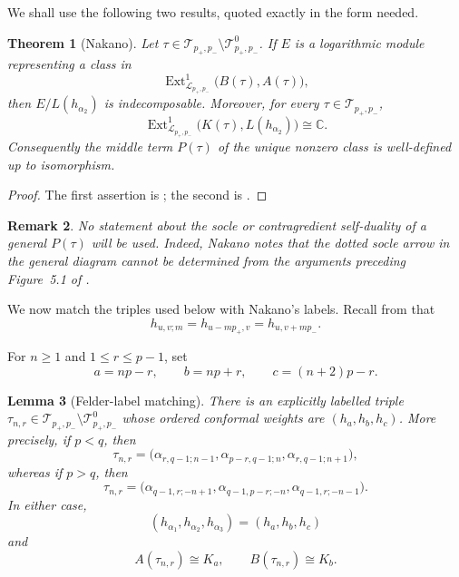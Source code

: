 \documentclass[12pt,leqno]{amsart}
\numberwithin{equation}{section}
\newtheorem{thm}{Theorem}[section]
\newtheorem{lem}[thm]{Lemma}
\newtheorem{rmk}[thm]{Remark}
\newcommand{\Ext}{\operatorname{Ext}}
\def\C{\mathbb{C}}
\begin{document}
We shall use the following two results, quoted exactly in the form needed.

\begin{thm}[Nakano]\label{thm:Nakano-input}
Let $\tau\in\mathcal T_{p_+,p_-}\setminus\mathcal T^0_{p_+,p_-}$.  If $E$ is a
logarithmic module representing a class in
\[
 \Ext^1_{\mathscr L_{p_+,p_-}}\bigl(B(\tau),A(\tau)\bigr),
\]
then $E/L(h_{\alpha_2})$ is indecomposable.  Moreover, for every
$\tau\in\mathcal T_{p_+,p_-}$,
\[
 \Ext^1_{\mathscr L_{p_+,p_-}}
 \bigl(K(\tau),L(h_{\alpha_2})\bigr)\cong\C.
\]
Consequently the middle term $P(\tau)$ of the unique nonzero class is
well-defined up to isomorphism.
\end{thm}

\begin{proof}
The first assertion is \cite[Theorem~5.11]{Nakano}; the second is
\cite[Proposition~5.12 and Definition~5.13]{Nakano}.
\end{proof}

\begin{rmk}\label{rmk:no-socle}
No statement about the socle or contragredient self-duality of a general
$P(\tau)$ will be used.  Indeed, Nakano notes that the dotted socle arrow in
the general diagram cannot be determined from the arguments preceding
Figure~5.1 of \cite{Nakano}.
\end{rmk}

We now match the triples used below with Nakano's labels.  Recall from
\cite[(2.3)--(2.4)]{Nakano} that
\begin{equation}\label{eq:Nakano-weight-shift}
 h_{u,v;m}=h_{u-mp_+,v}=h_{u,v+mp_-}.
\end{equation}

For $n\geq1$ and $1\leq r\leq p-1$, set
\begin{equation}\label{eq:abc}
 a=np-r,\qquad b=np+r,\qquad c=(n+2)p-r.
\end{equation}

\begin{lem}[Felder-label matching]\label{lem:Felder-labels}
There is an explicitly labelled triple
\(\tau_{n,r}\in\mathcal T_{p_+,p_-}\setminus\mathcal T^0_{p_+,p_-}\) whose ordered
conformal weights are \((h_a,h_b,h_c)\).  More precisely, if $p<q$, then
\begin{equation}\label{eq:tau-p-less-q}
 \tau_{n,r}=
 \bigl(\alpha_{r,q-1;n-1},
       \alpha_{p-r,q-1;n},
       \alpha_{r,q-1;n+1}\bigr),
\end{equation}
whereas if $p>q$, then
\begin{equation}\label{eq:tau-p-greater-q}
 \tau_{n,r}=
 \bigl(\alpha_{q-1,r;-n+1},
       \alpha_{q-1,p-r;-n},
       \alpha_{q-1,r;-n-1}\bigr).
\end{equation}
In either case,
\begin{equation}\label{eq:tau-nr}
 (h_{\alpha_1},h_{\alpha_2},h_{\alpha_3})=(h_a,h_b,h_c)
\end{equation}
and
\begin{equation}\label{eq:A-B-tau}
 A(\tau_{n,r})\cong K_a,
 \qquad B(\tau_{n,r})\cong K_b.
\end{equation}
\end{lem}
\end{document}
